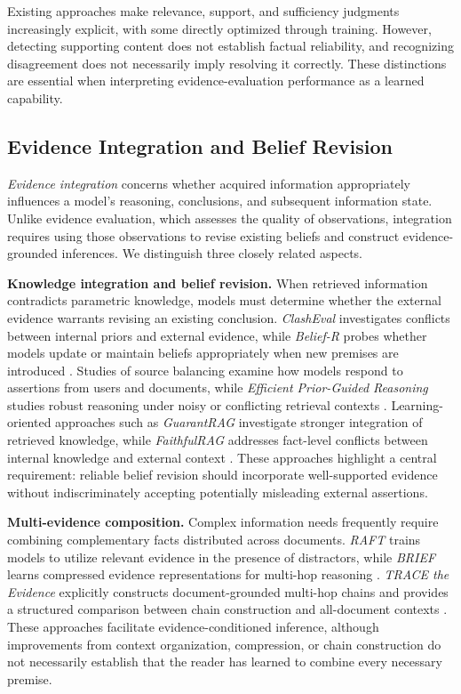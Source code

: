 Existing approaches make relevance, support, and sufficiency judgments increasingly explicit, with some directly optimized through training. However, detecting supporting content does not establish factual reliability, and recognizing disagreement does not necessarily imply resolving it correctly. These distinctions are essential when interpreting evidence-evaluation performance as a learned capability.

\subsection{Evidence Integration and Belief Revision}
\label{sec:evidence_integration}

\textit{Evidence integration} concerns whether acquired information appropriately influences a model's reasoning, conclusions, and subsequent information state. Unlike evidence evaluation, which assesses the quality of observations, integration requires using those observations to revise existing beliefs and construct evidence-grounded inferences. We distinguish three closely related aspects.

\textbf{Knowledge integration and belief revision.}
When retrieved information contradicts parametric knowledge, models must determine whether the external evidence warrants revising an existing conclusion. \textit{ClashEval} investigates conflicts between internal priors and external evidence, while \textit{Belief-R} probes whether models update or maintain beliefs appropriately when new premises are introduced \cite{clasheval,belief_r}. Studies of source balancing examine how models respond to assertions from users and documents, while \textit{Efficient Prior-Guided Reasoning} studies robust reasoning under noisy or conflicting retrieval contexts \cite{source_balancing,efficient_prior_guided_reasoning}. Learning-oriented approaches such as \textit{GuarantRAG} investigate stronger integration of retrieved knowledge, while \textit{FaithfulRAG} addresses fact-level conflicts between internal knowledge and external context \cite{guarantrag,faithfulrag}. These approaches highlight a central requirement: reliable belief revision should incorporate well-supported evidence without indiscriminately accepting potentially misleading external assertions.

\textbf{Multi-evidence composition.}
Complex information needs frequently require combining complementary facts distributed across documents. \textit{RAFT} trains models to utilize relevant evidence in the presence of distractors, while \textit{BRIEF} learns compressed evidence representations for multi-hop reasoning \cite{raft,brief}. \textit{TRACE the Evidence} explicitly constructs document-grounded multi-hop chains and provides a structured comparison between chain construction and all-document contexts \cite{trace_evidence}. These approaches facilitate evidence-conditioned inference, although improvements from context organization, compression, or chain construction do not necessarily establish that the reader has learned to combine every necessary premise.

